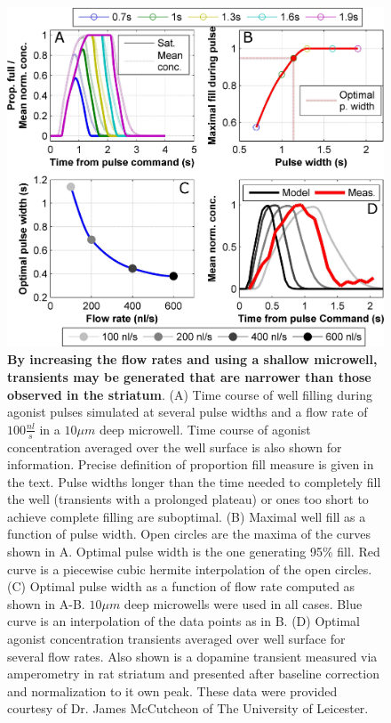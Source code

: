   \begin{figure}[!htb]
       \centering
       \includegraphics[width=13.17cm]{chapter6/figures/imporvedTimeScales/FlowRateDeterminedTimeScales.jpg}
       \caption[Shortening of the agonist transient time scales by changing the microfluidic parameters]{\textbf{By increasing the flow rates and using a shallow microwell, transients may be generated that are narrower than those observed in the striatum}. (A) Time course of well filling during agonist pulses simulated at several pulse widths and a flow rate of \(100\frac{nl}{s}\) in a \(10 \mu m\) deep microwell. Time course of agonist concentration averaged over the well surface is also shown for information. Precise definition of proportion fill measure is given in the text. Pulse widths longer than the time needed to completely fill the well (transients with a prolonged plateau) or ones too short to achieve complete filling are suboptimal. (B) Maximal well fill as a function of pulse width. Open circles are the maxima of the curves shown in A. Optimal pulse width is the one generating 95\% fill. Red curve is a piecewise cubic hermite interpolation of the open circles. (C) Optimal pulse width as a function of flow rate computed as shown in A-B. \(10\mu m\) deep microwells were used in all cases. Blue curve is an interpolation of the data points as in B. (D) Optimal agonist concentration transients averaged over well surface for several flow rates. Also shown is a dopamine transient measured via amperometry in rat striatum and presented after baseline correction and normalization to it own peak. These data were provided courtesy of Dr. James McCutcheon of The University of Leicester.}
       \label{fig:pulses:reducedTimeScales}
  \end{figure}

